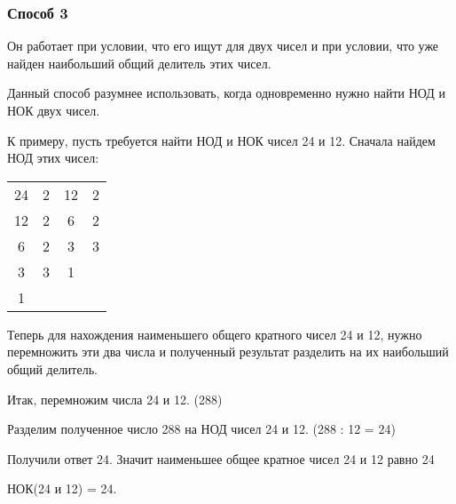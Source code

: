 \documentclass[12pt]{article}
\begin{document}
    \subsubsection{Способ 3}
    Он работает при условии, что его ищут для двух чисел и при условии, что уже найден наибольший общий делитель этих чисел.\par
    Данный способ разумнее использовать, когда одновременно нужно найти НОД и НОК двух чисел.\par
    К примеру, пусть требуется найти НОД и НОК чисел 24 и 12. Сначала найдем НОД этих чисел:\par
    \begin{tabular}{c|cc|c}
         24 & 2 & 12 & 2 \\
         12 & 2 & 6 & 2 \\
         6 & 2 & 3 & 3 \\
         3 & 3 & 1 & \\
         1 & &  
    \end{tabular}\par
    Теперь для нахождения наименьшего общего кратного чисел 24 и 12, нужно перемножить эти два числа и полученный результат разделить на их наибольший общий делитель.\par
    Итак, перемножим числа 24 и 12. (288)\par
    Разделим полученное число 288 на НОД чисел 24 и 12. (288 : 12 = 24)\par
    Получили ответ 24. Значит наименьшее общее кратное чисел 24 и 12 равно 24\par
    НОК(24 и 12) = 24.\par
\end{document}
